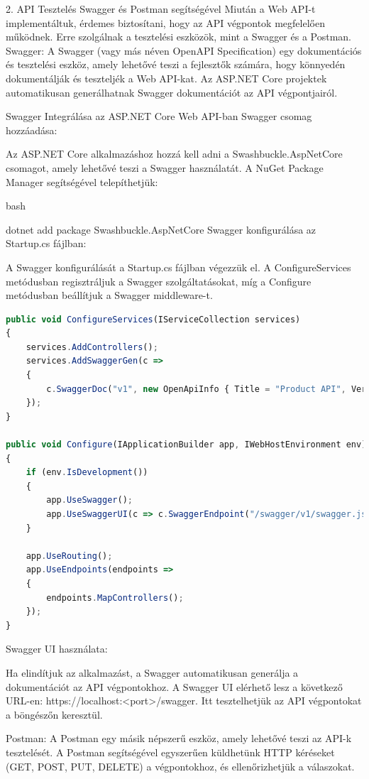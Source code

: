 \documentclass[colorlinks]{thesis-kando}
\theoremstyle{definition}
\theoremstyle{remark}
\begin{document}
2. API Tesztelés Swagger és Postman segítségével
Miután a Web API-t implementáltuk, érdemes biztosítani, hogy az API végpontok megfelelően működnek. Erre szolgálnak a tesztelési eszközök, mint a Swagger és a Postman.
Swagger:
A Swagger (vagy más néven OpenAPI Specification) egy dokumentációs és tesztelési eszköz, amely lehetővé teszi a fejlesztők számára, hogy könnyedén dokumentálják és teszteljék a Web API-kat. Az ASP.NET Core projektek automatikusan generálhatnak Swagger dokumentációt az API végpontjairól.

Swagger Integrálása az ASP.NET Core Web API-ban
Swagger csomag hozzáadása:

Az ASP.NET Core alkalmazáshoz hozzá kell adni a Swashbuckle.AspNetCore csomagot, amely lehetővé teszi a Swagger használatát. A NuGet Package Manager segítségével telepíthetjük:

bash

dotnet add package Swashbuckle.AspNetCore
Swagger konfigurálása az Startup.cs fájlban:

A Swagger konfigurálását a Startup.cs fájlban végezzük el. A ConfigureServices metódusban regisztráljuk a Swagger szolgáltatásokat, míg a Configure metódusban beállítjuk a Swagger middleware-t.


\begin{lstlisting}[language=JavaScript]
public void ConfigureServices(IServiceCollection services)
{
	services.AddControllers();
	services.AddSwaggerGen(c =>
	{
		c.SwaggerDoc("v1", new OpenApiInfo { Title = "Product API", Version = "v1" });
	});
}

public void Configure(IApplicationBuilder app, IWebHostEnvironment env)
{
	if (env.IsDevelopment())
	{
		app.UseSwagger();
		app.UseSwaggerUI(c => c.SwaggerEndpoint("/swagger/v1/swagger.json", "Product API v1"));
	}
	
	app.UseRouting();
	app.UseEndpoints(endpoints =>
	{
		endpoints.MapControllers();
	});
}
\end{lstlisting}

Swagger UI használata:

Ha elindítjuk az alkalmazást, a Swagger automatikusan generálja a dokumentációt az API végpontokhoz. A Swagger UI elérhető lesz a következő URL-en: https://localhost:<port>/swagger. Itt tesztelhetjük az API végpontokat a böngészőn keresztül.

Postman:
A Postman egy másik népszerű eszköz, amely lehetővé teszi az API-k tesztelését. A Postman segítségével egyszerűen küldhetünk HTTP kéréseket (GET, POST, PUT, DELETE) a végpontokhoz, és ellenőrizhetjük a válaszokat.
\end{document}
